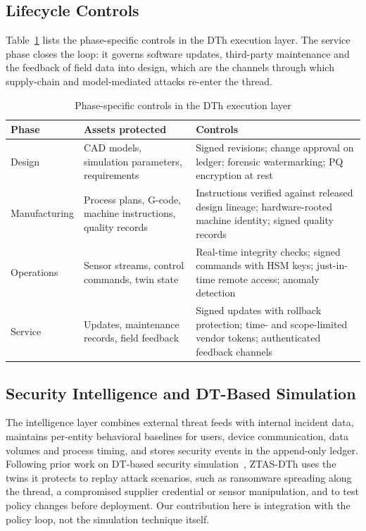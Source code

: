 \documentclass[journal]{IEEEtran}
\newcommand{\ztas}{ZTAS-DTh}
\begin{document}
\subsection{Lifecycle Controls}
Table~\ref{tab:lifecycle} lists the phase-specific controls in the DTh execution layer. The service phase closes the loop: it governs software updates, third-party maintenance and the feedback of field data into design, which are the channels through which supply-chain and model-mediated attacks re-enter the thread.

\begin{table}[!t]
\centering
\caption{Phase-specific controls in the DTh execution layer}
\label{tab:lifecycle}
\footnotesize
\begin{tabular}{@{}p{1.65cm}p{2.9cm}p{3.1cm}@{}}
\toprule
Phase & Assets protected & Controls \\
\midrule
Design & CAD models, simulation parameters, requirements & Signed revisions; change approval on ledger; forensic watermarking; PQ encryption at rest \\
Manufacturing & Process plans, G-code, machine instructions, quality records & Instructions verified against released design lineage; hardware-rooted machine identity; signed quality records \\
Operations & Sensor streams, control commands, twin state & Real-time integrity checks; signed commands with HSM keys; just-in-time remote access; anomaly detection \\
Service & Updates, maintenance records, field feedback & Signed updates with rollback protection; time- and scope-limited vendor tokens; authenticated feedback channels \\
\bottomrule
\end{tabular}
\end{table}

\subsection{Security Intelligence and DT-Based Simulation}
\label{sec:arch-intel}
The intelligence layer combines external threat feeds with internal incident data, maintains per-entity behavioral baselines for users, device communication, data volumes and process timing, and stores security events in the append-only ledger. Following prior work on DT-based security simulation~\cite{eckhart2018sec,dietz2020soc}, \ztas{} uses the twins it protects to replay attack scenarios, such as ransomware spreading along the thread, a compromised supplier credential or sensor manipulation, and to test policy changes before deployment. Our contribution here is integration with the policy loop, not the simulation technique itself.
\end{document}
